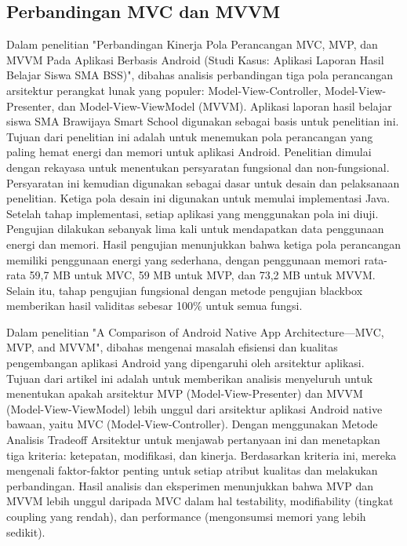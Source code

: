 \documentclass[conference]{IEEEtran}
\begin{document}
	\subsection{Perbandingan MVC dan MVVM}
	Dalam penelitian "Perbandingan Kinerja Pola Perancangan MVC, MVP, dan MVVM Pada Aplikasi Berbasis Android (Studi Kasus: Aplikasi Laporan Hasil Belajar Siswa SMA BSS)"\cite{Perbandingan1}, dibahas analisis perbandingan tiga pola perancangan arsitektur perangkat lunak yang populer: Model-View-Controller, Model-View-Presenter, dan Model-View-ViewModel (MVVM).  Aplikasi laporan hasil belajar siswa SMA Brawijaya Smart School digunakan sebagai basis untuk penelitian ini. Tujuan dari penelitian ini adalah untuk menemukan pola perancangan yang paling hemat energi dan memori untuk aplikasi Android. Penelitian dimulai dengan rekayasa untuk menentukan persyaratan fungsional dan non-fungsional. Persyaratan ini kemudian digunakan sebagai dasar untuk desain dan pelaksanaan penelitian. Ketiga pola desain ini digunakan untuk memulai implementasi Java. Setelah tahap implementasi, setiap aplikasi yang menggunakan pola ini diuji. Pengujian dilakukan sebanyak lima kali untuk mendapatkan data penggunaan energi dan memori. Hasil pengujian menunjukkan bahwa ketiga pola perancangan memiliki penggunaan energi yang sederhana, dengan penggunaan memori rata-rata 59,7 MB untuk MVC, 59 MB untuk MVP, dan 73,2 MB untuk MVVM. Selain itu, tahap pengujian fungsional dengan metode pengujian blackbox memberikan hasil validitas sebesar 100\% untuk semua fungsi.
	
	Dalam penelitian "A Comparison of Android Native App Architecture—MVC, MVP, and MVVM"\cite{Perbandingan2}, dibahas mengenai masalah efisiensi dan kualitas pengembangan aplikasi Android yang dipengaruhi oleh arsitektur aplikasi. Tujuan dari artikel ini adalah untuk memberikan analisis menyeluruh untuk menentukan apakah arsitektur MVP (Model-View-Presenter) dan MVVM (Model-View-ViewModel) lebih unggul dari arsitektur aplikasi Android native bawaan, yaitu MVC (Model-View-Controller). Dengan menggunakan Metode Analisis Tradeoff Arsitektur untuk menjawab pertanyaan ini dan menetapkan tiga kriteria: ketepatan, modifikasi, dan kinerja. Berdasarkan kriteria ini, mereka mengenali faktor-faktor penting untuk setiap atribut kualitas dan melakukan perbandingan. Hasil analisis dan eksperimen menunjukkan bahwa MVP dan MVVM lebih unggul daripada MVC dalam hal testability, modifiability (tingkat coupling yang rendah), dan performance (mengonsumsi memori yang lebih sedikit).
	
\end{document}
